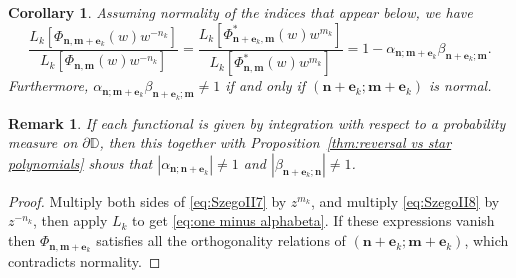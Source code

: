 \documentclass[reqno,centertags,11pt,draft]{amsart}
\newtheorem{cor}[thm]{Corollary}
\newtheorem{rem}[thm]{Remark}
\newcommand{\T}{\mathbb{\partial\mathbb{D}}}
\newcommand{\abs}[1]{\left|#1\right|}
\begin{document}
\begin{cor}Assuming normality of the indices that appear below, we have 
\begin{equation}
    \label{eq:one minus alphabeta}
      \frac{L_k[\Phi_{\bm{n},\bm{m}+\bm{e}_k}(w)w^{-n_k}]}{L_k[\Phi_{\bm{n},\bm{m}}(w)w^{-n_k}]}
      =
        \frac{L_k[\Phi_{\bm{n}+\bm{e}_k,\bm{m}}^*(w)w^{m_k}]}{L_k[\Phi_{\bm{n},\bm{m}}^*(w)w^{m_k}]} = 1-\alpha_{\bm{n};\bm{m}+\bm{e}_k}\beta_{\bm{n}+\bm{e}_k;\bm{m}}.
    \end{equation}
    Furthermore, 
    $\alpha_{\bm{n};\bm{m}+\bm{e}_k}\beta_{\bm{n}+\bm{e}_k;\bm{m}} \neq 1$ if and only if $(\bm{n}+\bm{e}_k;\bm{m}+\bm{e}_k)$ is normal.
\end{cor}
\begin{rem}
    If each functional is given by integration with respect to a probability measure on $\T$, then this together with Proposition~\ref{thm:reversal vs star polynomials} shows that $\abs{\alpha_{\bm{n};\bm{n}+\bm{e}_k}} \neq 1$ and $\abs{\beta_{\bm{n}+\bm{e}_k;\bm{n}}} \neq 1$.
\end{rem}

\begin{proof}
    Multiply both sides of \eqref{eq:SzegoII7} by $z^{m_k}$, and multiply \eqref{eq:SzegoII8} by $z^{-n_k}$, then apply $L_k$ to get \eqref{eq:one minus alphabeta}. If these expressions vanish then $\Phi_{\bm{n},\bm{m}+\bm{e}_k}$ satisfies all the orthogonality relations of $(\bm{n}+\bm{e}_k;\bm{m}+\bm{e}_k)$, which contradicts normality. 
\end{proof}
\end{document}
